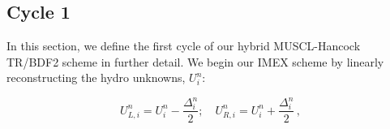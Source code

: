 \documentclass[preprint,12pt]{elsarticle}
\newcommand{\be}{\begin{equation}}
\newcommand{\ee}{\end{equation}}
\newcommand{\pec}{\, ,}
\newcommand{\lequ}[1]{\label{eq:#1}}
\begin{document}

\subsection{Cycle 1}
In this section, we define the first cycle of our hybrid MUSCL-Hancock TR/BDF2 scheme in further detail.  We begin our IMEX scheme by linearly reconstructing the hydro unknowns, $U_i^n$: 

\be
U_{L,i}^n = U_i^n - \frac{\Delta^n_i}{2};\quad U_{R,i}^n = U_i^n + \frac{\Delta^n_i}{2} \pec
\lequ{reconstructed}
\ee
\end{document}
